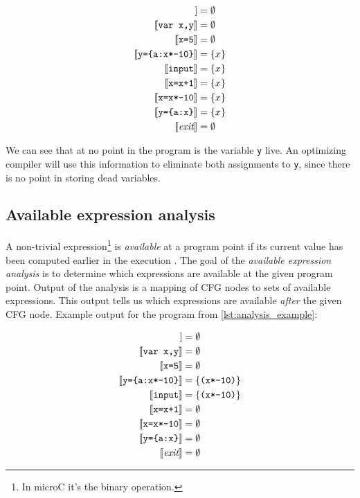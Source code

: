 \documentclass[thesis=M,english]{FITthesis}[2019/12/23]
\begin{document}
\begin{align*}
    [\![ \emph{entry} ]\!] &= \emptyset\\
    [\![ \texttt{var x,y} ]\!] &= \emptyset\\
    [\![ \texttt{x=5} ]\!] &= \emptyset\\
    [\![ \texttt{y=\{a:x*-10\}} ]\!] &= \{ x \}\\
    [\![ \texttt{input} ]\!] &= \{ x \}\\
    [\![ \texttt{x=x+1} ]\!] &= \{ x \}\\
    [\![ \texttt{x=x*-10} ]\!] &= \{ x \}\\
    [\![ \texttt{y=\{a:x\}} ]\!] &= \{ x \}\\
    [\![ \emph{exit} ]\!] &= \emptyset
\end{align*}

We can see that at no point in the program is the variable \texttt{y} live. An optimizing compiler will use this information to eliminate both assignments to \texttt{y}, since there is no point in storing dead variables.

\subsection{Available expression analysis}
A non-trivial expression\footnote{In microC it's the binary operation.} is \emph{available} at a program point if its current value has been computed earlier in the execution \cite[Chap. 5.5]{spa}. The goal of the \emph{available expression analysis} is to determine which expressions are available at the given program point. Output of the analysis is a mapping of CFG nodes to sets of available expressions. This output tells us which expressions are available \emph{after} the given CFG node. Example output for the program from \autoref{lst:analysis_example}:

\begin{align*}
    [\![ \emph{entry} ]\!] &= \emptyset\\
    [\![ \texttt{var x,y} ]\!] &= \emptyset\\
    [\![ \texttt{x=5} ]\!] &= \emptyset\\
    [\![ \texttt{y=\{a:x*-10\}} ]\!] &= \{ \texttt{(x*-10)} \}\\
    [\![ \texttt{input} ]\!] &= \{ \texttt{(x*-10)} \}\\
    [\![ \texttt{x=x+1} ]\!] &= \emptyset\\
    [\![ \texttt{x=x*-10} ]\!] &= \emptyset\\
    [\![ \texttt{y=\{a:x\}} ]\!] &= \emptyset\\
    [\![ \emph{exit} ]\!] &= \emptyset\\
\end{align*}
\end{document}
